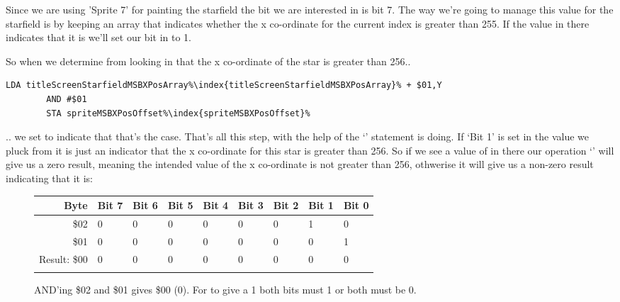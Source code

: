 Since we are using 'Sprite 7' for painting the starfield the bit we are interested in is bit 7. The way
we're going to manage this value for the starfield is by keeping an array 
that indicates whether the x co-ordinate for the current index is greater than 255. If the value in there
indicates that it is we'll set our bit in  to 1.

So when
we determine from looking in  that the x co-ordinate of the star is greater
than 256..

\begin{lstlisting}[escapechar=\%]
        LDA titleScreenStarfieldMSBXPosArray%\index{titleScreenStarfieldMSBXPosArray}% + $01,Y
        AND #$01
        STA spriteMSBXPosOffset%\index{spriteMSBXPosOffset}%
\end{lstlisting}

.. we set  to indicate that that's the case. That's all this step, with the help
of the `' statement is doing. If `Bit 1' is
set in the value we pluck from  it is just an indicator that the x co-ordinate
for this star is greater than 256. So if we see a value of  in there our operation `' will
give us a zero result, meaning the intended value of the x co-ordinate is not greater than 256, othwerise it will give
us a non-zero result indicating that it is:

\begin{figure}[H]
  {
    \setlength{\tabcolsep}{3.0pt}
    \setlength\cmidrulewidth{\heavyrulewidth} %
    \begin{adjustbox}{width=10cm,center}

      \begin{tabular}{rllllllll}
        \toprule
        Byte & Bit 7 & Bit 6 & Bit 5 & Bit 4 & Bit 3 & Bit 2 & Bit 1 & Bit 0        \\
        \midrule
        \$02 & 0 & 0 & 0 & 0 & 0 & 0 & 1 & 0 \\
        \$01 & 0 & 0 & 0 & 0 & 0 & 0 & 0 & 1 \\
        \midrule
        Result: \$00 & 0 & 0 & 0 & 0 & 0 & 0 & 0 & 0 \\
        \addlinespace
        \bottomrule
      \end{tabular}
    \end{adjustbox}
  }\caption*{AND'ing \$02 and \$01 gives \$00 (0). For  to give a 1 both bits must 1 or both must be 0.}
\end{figure}

